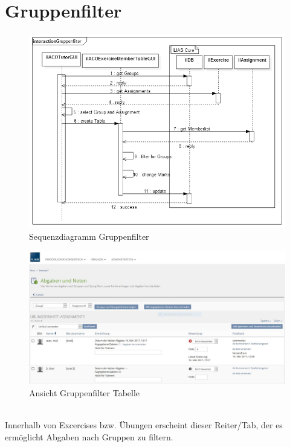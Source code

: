 \section{Gruppenfilter}
\begin{figure}[h!]
	\centering
	\includegraphics[width=.7\textwidth]{img/seq_tutorGUI.png}
	\caption{Sequenzdiagramm Gruppenfilter}
\end{figure}
\begin{figure}[h!]
	\centering
	\includegraphics[width=1\textwidth]{img/excerciseGruppentabelle.jpg}
	\caption{Ansicht Gruppenfilter Tabelle}
\end{figure}
~\\Innerhalb von Excercises bzw. Übungen erscheint dieser Reiter/Tab, der es ermöglicht Abgaben nach Gruppen zu filtern. 



